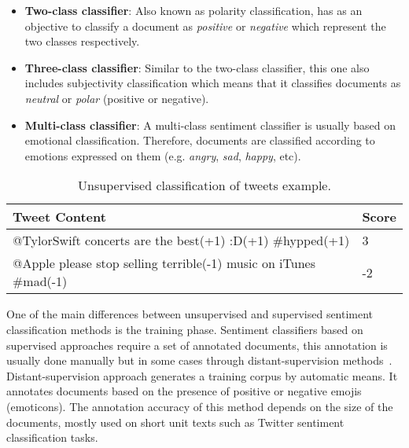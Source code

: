 { \begin{itemize}
  \item \textbf{Two-class classifier}: Also known as polarity classification, has as an objective to classify a document as \textit{positive} or \textit{negative} which represent the two classes respectively.
  
  \item \textbf{Three-class classifier}: Similar to the two-class classifier, this one also includes subjectivity classification which means that it classifies documents as \textit{neutral} or \textit{polar} (positive or negative).
  
  \item \textbf{Multi-class classifier}: A multi-class sentiment classifier is usually based on emotional classification. Therefore, documents are classified according to emotions expressed on them (e.g. \textit{angry}, \textit{sad}, \textit{happy}, etc). 
  
\end{itemize}

\begin{table}[]
\centering
\caption{Unsupervised classification of tweets example.}
\label{tab:unsupervised_example}
\begin{tabular}{l|l}
\textbf{Tweet Content}                                                           & \textbf{Score} \\ \hline
{\color[HTML]{000000} @TylorSwift concerts are the best{\color[HTML]{036400}(+1)} :D{\color[HTML]{036400}(+1)} \#hypped{\color[HTML]{036400}(+1)}} & {\color[HTML]{036400} 3} \\ \hline
@Apple please stop selling terrible{\color[HTML]{CB0000}(-1)} music on iTunes \#mad{\color[HTML]{CB0000}(-1)}                & {\color[HTML]{CB0000}-2}                       \\ \hline
\end{tabular}
\end{table}

\pagebreak

One of the main differences between unsupervised and supervised sentiment classification methods is the training phase. Sentiment classifiers based on supervised approaches require a set of annotated documents, this annotation is usually done manually but in some cases through distant-supervision methods~\cite{go2009twitter}. Distant-supervision approach generates a training corpus by automatic means. It annotates documents based on the presence of positive or negative emojis (emoticons). The annotation accuracy of this method depends on the size of the documents, mostly used on short unit texts such as Twitter sentiment classification tasks. 

}
